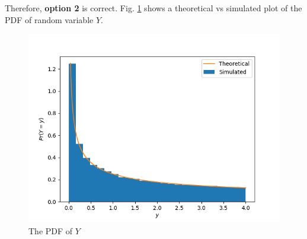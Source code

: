 \documentclass[journal,12pt,twocolumn]{IEEEtran}
\begin{document}
Therefore, \textbf{option 2} is correct. Fig. \ref{CDF_Y} shows a theoretical vs simulated plot of the PDF of random variable $Y$.
\begin{figure}[!hbt]
    \centering
	\includegraphics[width=\columnwidth]{./Figures/Figure_1.png}
    \caption{The PDF of $Y$}
    \label{CDF_Y}
\end{figure}
\end{document}
